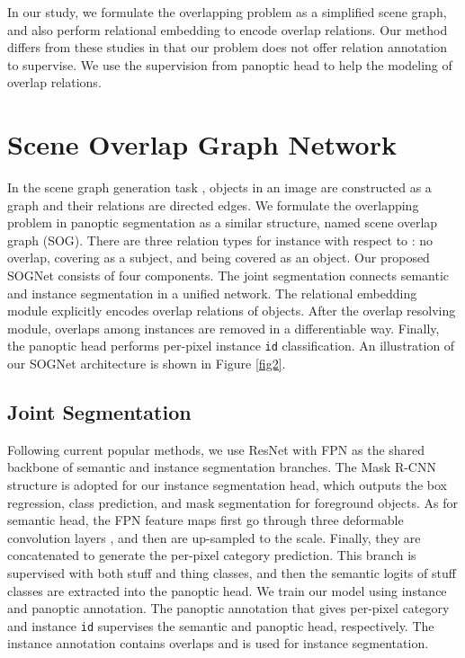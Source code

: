 \documentclass[letterpaper]{article} \usepackage{aaai20}  \usepackage{times}  \usepackage{helvet} \usepackage{courier}  \usepackage[hyphens]{url}  \usepackage{graphicx} \urlstyle{rm} \def\UrlFont{\rm}  \usepackage{graphicx}  \frenchspacing  \setlength{\pdfpagewidth}{8.5in}  \setlength{\pdfpageheight}{11in}
\begin{document}
In our study, we formulate the overlapping problem as a simplified scene graph, and also perform relational embedding to encode overlap relations. Our method differs from these studies in that our problem does not offer relation annotation to supervise. We use the supervision from panoptic head to help the modeling of overlap relations. 







\section{Scene Overlap Graph Network}

In the scene graph generation task \cite{zellers2018neural,woo2018linknet,xu2017scene}, objects in an image are constructed as a graph and their relations are directed edges. We formulate the overlapping problem in panoptic segmentation as a similar structure, named scene overlap graph (SOG). There are three relation types for instance  with respect to : no overlap, covering as a subject, and being covered as an object. Our proposed SOGNet consists of four components. The joint segmentation connects semantic and instance segmentation in a unified network. The relational embedding module explicitly encodes overlap relations of objects. After the overlap resolving module, overlaps among instances are removed in a differentiable way. Finally, the panoptic head performs per-pixel instance \verb|id| classification. An illustration of our SOGNet architecture is shown in Figure \ref{fig2}.


\subsection{Joint Segmentation}

Following current popular methods, we use ResNet with FPN as the shared backbone of semantic and instance segmentation branches. The Mask R-CNN structure is adopted for our instance segmentation head, which outputs the box regression, class prediction, and mask segmentation for foreground objects. As for semantic head, the FPN feature maps first go through three  deformable convolution layers \cite{dai2017deformable}, and then are up-sampled to the  scale. Finally, they are concatenated to generate the per-pixel category prediction. This branch is supervised with both stuff and thing classes, and then the semantic logits of stuff classes are extracted into the panoptic head. We train our model using instance and panoptic annotation. The panoptic annotation that gives per-pixel category and instance \verb|id| supervises the semantic and panoptic head, respectively. The instance annotation contains overlaps and is used for instance segmentation. 
\end{document}
